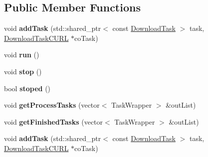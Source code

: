 \subsection*{Public Member Functions}
\begin{DoxyCompactItemize}
\item 
\mbox{\label{classcocos2d_1_1network_1_1DownloaderCURL_1_1Impl_a22d7c364d417fc1fc71bd890938e6be6}} 
void {\bfseries add\+Task} (std\+::shared\+\_\+ptr$<$ const \hyperlink{classcocos2d_1_1network_1_1DownloadTask}{Download\+Task} $>$ task, \hyperlink{classcocos2d_1_1network_1_1DownloadTaskCURL}{Download\+Task\+C\+U\+RL} $\ast$co\+Task)
\item 
\mbox{\label{classcocos2d_1_1network_1_1DownloaderCURL_1_1Impl_a96828122e9c3fde4fc8327ee134901aa}} 
void {\bfseries run} ()
\item 
\mbox{\label{classcocos2d_1_1network_1_1DownloaderCURL_1_1Impl_abacb6d16beea9d1fa4f612c56c7dea0a}} 
void {\bfseries stop} ()
\item 
\mbox{\label{classcocos2d_1_1network_1_1DownloaderCURL_1_1Impl_a1f5b566200c0020cb23b2661d1cec3b3}} 
bool {\bfseries stoped} ()
\item 
\mbox{\label{classcocos2d_1_1network_1_1DownloaderCURL_1_1Impl_a3d5482c0c85ac4a380309bbf31428b59}} 
void {\bfseries get\+Process\+Tasks} (vector$<$ Task\+Wrapper $>$ \&out\+List)
\item 
\mbox{\label{classcocos2d_1_1network_1_1DownloaderCURL_1_1Impl_a5516d1c5320815d1d9118910a66480d2}} 
void {\bfseries get\+Finished\+Tasks} (vector$<$ Task\+Wrapper $>$ \&out\+List)
\item 
\mbox{\label{classcocos2d_1_1network_1_1DownloaderCURL_1_1Impl_a22d7c364d417fc1fc71bd890938e6be6}} 
void {\bfseries add\+Task} (std\+::shared\+\_\+ptr$<$ const \hyperlink{classcocos2d_1_1network_1_1DownloadTask}{Download\+Task} $>$ task, \hyperlink{classcocos2d_1_1network_1_1DownloadTaskCURL}{Download\+Task\+C\+U\+RL} $\ast$co\+Task)

\end{DoxyCompactItemize}
